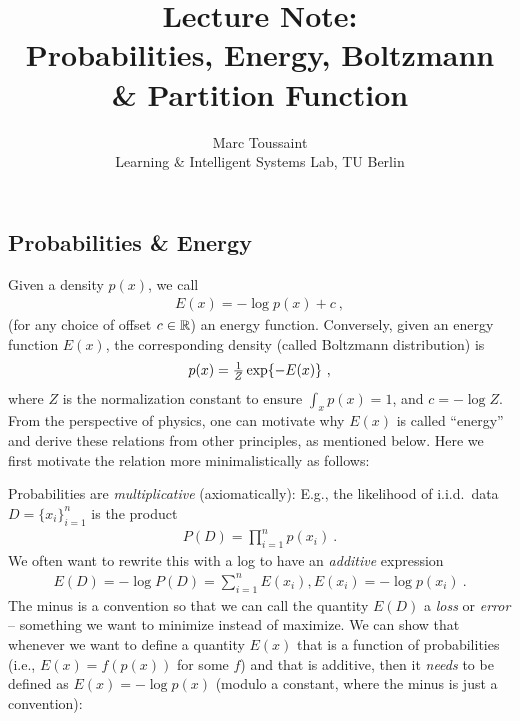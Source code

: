 
\note

\title{Lecture Note:\\ Probabilities, Energy, Boltzmann \& Partition Function}
\author{Marc Toussaint\\\small Learning \& Intelligent Systems Lab, TU Berlin}

\makeatletter
\renewcommand{\@seccntformat}[1]{}
\makeatother

\notetitle


\subsection{Probabilities \& Energy}

Given a density $p(x)$, we call
\begin{align}
E(x) = -\log p(x) + c ~,
\end{align}
(for any choice of offset $c\in{\mathbb{R}}$) an energy function. Conversely, given an energy function $E(x)$, the corresponding density (called Boltzmann distribution) is
\begin{align}
p(x) = \textstyle\frac 1Z \exp\lbrace-E(x)\rbrace ~,
\end{align}
where $Z$ is the normalization constant to ensure $\int_x p(x) = 1$,
and $c=-\log Z$. From the perspective of physics, one can motivate why
$E(x)$ is called ``energy'' and derive these relations from other
principles, as mentioned below. Here we first motivate the
relation more minimalistically as follows:

Probabilities are \emph{multiplicative} (axiomatically): E.g., the likelihood of i.i.d.\ data $D = \lbrace x_i \rbrace_{i=1}^n$ is the product
\begin{align}
P(D) = \prod_{i=1}^n p(x_i) ~.
\end{align}
We often want to rewrite this with a log to have an \emph{additive} expression
\begin{align}
E(D) = -\log P(D) = \sum_{i=1}^n E(x_i) \comma E(x_i) = -\log p(x_i) ~.
\end{align}
The minus is a convention so that we can call the quantity $E(D)$
a \emph{loss} or \emph{error} -- something we want to minimize instead
of maximize. We can show that whenever we want to define a
quantity $E(x)$ that is a function of probabilities (i.e., $E(x) =
f(p(x))$ for some $f$) and that is additive, then it \emph{needs} to
be defined as $E(x) = -\log p(x)$ (modulo a constant, where the minus
is just a convention):

